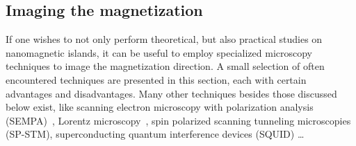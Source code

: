 \documentclass[11pt,a4paper,english,twoside]{article}
\begin{document}
\FloatBarrier
\subsection{Imaging the magnetization}
If one wishes to not only perform theoretical, but also practical studies on nanomagnetic islands, it can be useful to employ specialized microscopy techniques to image the magnetization direction. A small selection of often encountered techniques are presented in this section, each with certain advantages and disadvantages. Many other techniques besides those discussed below exist, like scanning electron microscopy with polarization analysis (SEMPA)~\cite{Imaging_SEMPA}, Lorentz microscopy~\cite{Imaging_Lorentz}, spin polarized scanning tunneling microscopies (SP-STM), superconducting quantum interference devices (SQUID) \dots \par
\end{document}
